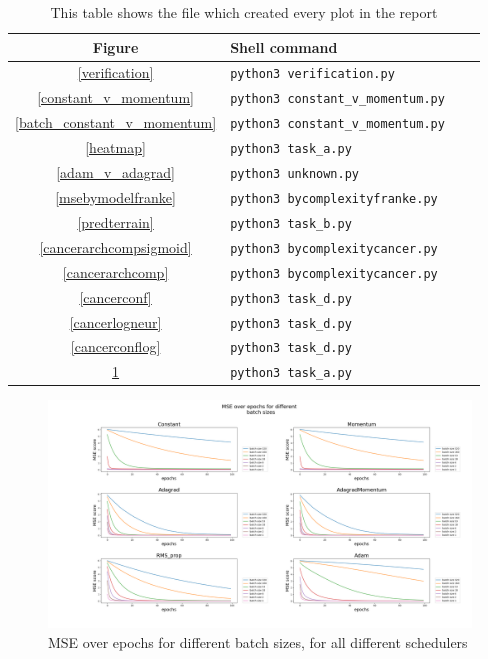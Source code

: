 \documentclass[onecolumn,10pt,cleanfoot]{asme2ej}
\begin{document}
\begin{table}[h]
\caption{This table shows the file which created every plot in the report}
\begin{center}
\label{allparamstable}
\begin{tabular}{c | l l l}
Figure & Shell command \\
\hline
\ref{verification} & \texttt{python3 verification.py}\\
\ref{constant_v_momentum} & \texttt{python3 constant\_v\_momentum.py}\\
\ref{batch_constant_v_momentum} & \texttt{python3 constant\_v\_momentum.py}\\
\ref{heatmap} & \texttt{python3 task\_a.py}\\
\ref{adam_v_adagrad} & \texttt{python3 unknown.py}\\
\ref{msebymodelfranke} & \texttt{python3 bycomplexityfranke.py}\\
\ref{predterrain} & \texttt{python3 task\_b.py}\\
\ref{cancerarchcompsigmoid} & \texttt{python3 bycomplexitycancer.py}\\
\ref{cancerarchcomp} & \texttt{python3 bycomplexitycancer.py}\\
\ref{cancerconf} & \texttt{python3 task\_d.py}\\
\ref{cancerlogneur} & \texttt{python3 task\_d.py}\\
\ref{cancerconflog} & \texttt{python3 task\_d.py}\\
\ref{sgdbatch} & \texttt{python3 task\_a.py}\\
\hline
\end{tabular}
\end{center}
\end{table}

\begin{figure}[H]
\centerline{\includegraphics[width=5in]{figure/SGD_batch_size_100e.png}}
\caption{MSE over epochs for different batch sizes, for all different schedulers}
\label{sgdbatch}
\end{figure}
\end{document}
